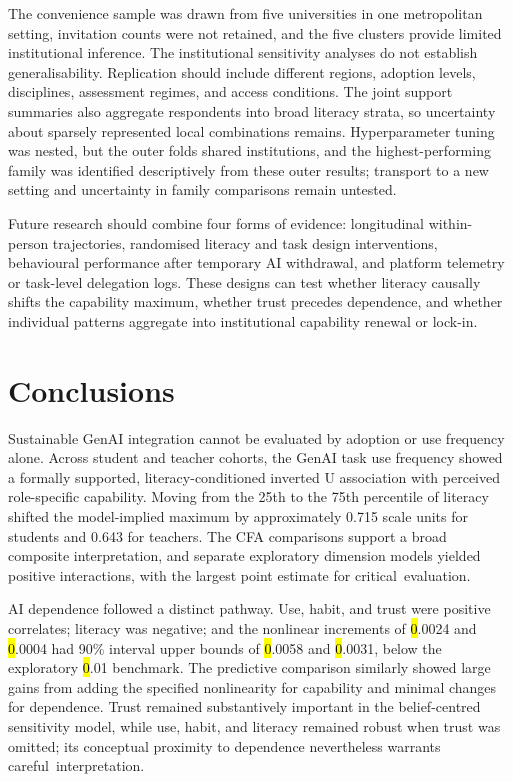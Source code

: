 \documentclass[sustainability,article,accept,moreauthors]{Definitions/mdpi}
\begin{document}
The convenience sample was drawn from five universities in one metropolitan setting, invitation counts were not retained, and the five clusters provide limited institutional inference. The institutional sensitivity analyses do not establish generalisability. Replication should include different regions, adoption levels, disciplines, assessment regimes, and access conditions. The joint support summaries also aggregate respondents into broad literacy strata, so uncertainty about sparsely represented local combinations remains. Hyperparameter tuning was nested, but the outer folds shared institutions, and the highest-performing family was identified descriptively from these outer results; transport to a new setting and uncertainty in family comparisons remain untested.

Future research should combine four forms of evidence: longitudinal within-person trajectories, randomised literacy and task design interventions, behavioural performance after temporary AI withdrawal, and platform telemetry or task-level delegation logs. These designs can test whether literacy causally shifts the capability maximum, whether trust precedes dependence, and whether individual patterns aggregate into institutional capability renewal or lock-in.

\section{Conclusions}\label{sec:conclusions}

Sustainable GenAI integration cannot be evaluated by adoption or use frequency alone. Across student and teacher cohorts, the GenAI task use frequency showed a formally supported, literacy-conditioned inverted U association with perceived role-specific capability. Moving from the 25th to the 75th percentile of literacy shifted the model-implied maximum by approximately 0.715 scale units for students and 0.643 for teachers. The CFA comparisons support a broad composite interpretation, and separate exploratory dimension models yielded positive interactions, with the largest point estimate for critical~evaluation.

AI dependence followed a distinct pathway. Use, habit, and trust were positive correlates; literacy was negative; and the nonlinear increments of \hl{0}.0024 and \hl{0}.0004 had 90\% interval upper bounds of \hl{0}.0058 and \hl{0}.0031, below the exploratory \hl{0}.01 benchmark. The predictive comparison similarly showed large gains from adding the specified nonlinearity for capability and minimal changes for dependence. Trust remained substantively important in the belief-centred sensitivity model, while use, habit, and literacy remained robust when trust was omitted; its conceptual proximity to dependence nevertheless warrants careful~interpretation.
\end{document}
